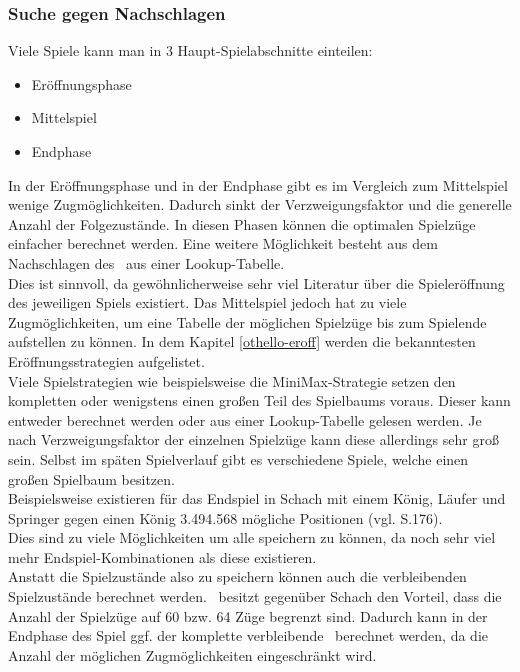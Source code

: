 \subsubsection{Suche gegen Nachschlagen}
Viele Spiele kann man in 3 Haupt-Spielabschnitte einteilen:
\begin{itemize}
\item Eröffnungsphase
\item Mittelspiel
\item Endphase
\end{itemize}
In der Eröffnungsphase und in der Endphase gibt es im Vergleich zum Mittelspiel wenige Zugmöglichkeiten. Dadurch sinkt der Verzweigungsfaktor und die generelle Anzahl der Folgezustände. In diesen Phasen können die optimalen Spielzüge einfacher berechnet werden. Eine weitere Möglichkeit besteht aus dem Nachschlagen des \states\ aus einer Lookup-Tabelle.
\\Dies ist sinnvoll, da gewöhnlicherweise sehr viel Literatur über die Spieleröffnung des jeweiligen Spiels existiert.%
Das Mittelspiel jedoch hat zu viele Zugmöglichkeiten, um eine Tabelle der möglichen Spielzüge bis zum Spielende aufstellen zu können. In dem Kapitel \ref{othello-eroff} werden die bekanntesten Eröffnungsstrategien aufgelistet.
\\Viele Spielstrategien wie beispielsweise die MiniMax-Strategie setzen den kompletten oder wenigstens einen großen Teil des Spielbaums voraus. Dieser kann entweder berechnet werden oder aus einer Lookup-Tabelle gelesen werden. Je nach Verzweigungsfaktor der einzelnen Spielzüge kann diese allerdings sehr groß sein. Selbst im späten Spielverlauf gibt es verschiedene Spiele, welche einen großen Spielbaum besitzen.
\\Beispielsweise existieren für das Endspiel in Schach mit einem König, Läufer und Springer gegen einen König 3.494.568 mögliche Positionen (vgl. \cite{Russell.2016} S.176).
\\Dies sind zu viele Möglichkeiten um alle speichern zu können, da noch sehr viel mehr Endspiel-Kombinationen als diese existieren.
\\Anstatt die Spielzustände also zu speichern können auch die verbleibenden Spielzustände berechnet werden. \ot\ besitzt gegenüber Schach den Vorteil, dass die Anzahl der Spielzüge auf 60 bzw. 64 Züge begrenzt sind. Dadurch kann in der Endphase des Spiel ggf. der komplette verbleibende \gtree\ berechnet werden, da die Anzahl der möglichen Zugmöglichkeiten eingeschränkt wird.

